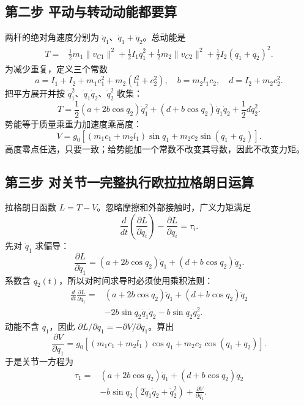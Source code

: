 \subsection{第二步 平动与转动动能都要算}
两杆的绝对角速度分别为 $\dot q_1$、$\dot q_1+\dot q_2$。总动能是
\begin{align}
 T={}&\tfrac12m_1\|v_{C1}\|^2+\tfrac12I_1\dot q_1^2
 +\tfrac12m_2\|v_{C2}\|^2+\tfrac12I_2(\dot q_1+\dot q_2)^2.
\end{align}
为减少重复，定义三个常数
\begin{equation}
 a=I_1+I_2+m_1c_1^2+m_2(l_1^2+c_2^2),\quad
 b=m_2l_1c_2,\quad d=I_2+m_2c_2^2.
\end{equation}
把平方展开并按 $\dot q_1^2$、$\dot q_1\dot q_2$、$\dot q_2^2$ 收集：
\begin{equation}\label{eq:T_2r_di}
 T=\frac12(a+2b\cos q_2)\dot q_1^2
 +(d+b\cos q_2)\dot q_1\dot q_2+\frac12d\dot q_2^2.
\end{equation}
势能等于质量乘重力加速度乘高度：
\begin{equation}
 V=g_0\left[(m_1c_1+m_2l_1)\sin q_1+m_2c_2\sin(q_1+q_2)\right].
\end{equation}
高度零点任选，只要一致；给势能加一个常数不改变其导数，因此不改变力矩。

\subsection{第三步 对关节一完整执行欧拉拉格朗日运算}
拉格朗日函数 $L=T-V$。忽略摩擦和外部接触时，广义力矩满足
\begin{equation}
 \frac d{dt}\left(\frac{\partial L}{\partial\dot q_i}\right)
 -\frac{\partial L}{\partial q_i}=\tau_i.
\end{equation}
先对 $\dot q_1$ 求偏导：
\[
 \frac{\partial L}{\partial\dot q_1}
 =(a+2b\cos q_2)\dot q_1+(d+b\cos q_2)\dot q_2.
\]
系数含 $q_2(t)$，所以对时间求导时必须使用乘积法则：
\begin{align}
 \frac d{dt}\frac{\partial L}{\partial\dot q_1}
 ={}&(a+2b\cos q_2)\ddot q_1+(d+b\cos q_2)\ddot q_2\\
 &-2b\sin q_2\dot q_1\dot q_2-b\sin q_2\dot q_2^2.
\end{align}
动能不含 $q_1$，因此 $\partial L/\partial q_1=-\partial V/\partial q_1$。算出
\[
 \frac{\partial V}{\partial q_1}
 =g_0[(m_1c_1+m_2l_1)\cos q_1+m_2c_2\cos(q_1+q_2)].
\]
于是关节一方程为
\begin{align}
 \tau_1={}&(a+2b\cos q_2)\ddot q_1+(d+b\cos q_2)\ddot q_2\\
 &-b\sin q_2(2\dot q_1\dot q_2+\dot q_2^2)+\frac{\partial V}{\partial q_1}.
\end{align}

